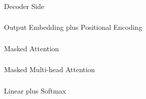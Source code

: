 \begin{frame}[fragile]\frametitle{}
\begin{center}
{\Large Decoder Side}
\end{center}
\end{frame}

\begin{frame}[fragile]\frametitle{}
\begin{center}
{\Large Output Embedding plus Positional Encoding}
\end{center}
\end{frame}

\begin{frame}[fragile]\frametitle{}
\begin{center}
{\Large Masked Attention}
\end{center}
\end{frame}

\begin{frame}[fragile]\frametitle{}
\begin{center}
{\Large Masked Multi-head Attention}
\end{center}
\end{frame}


\begin{frame}[fragile]\frametitle{}
\begin{center}
{\Large Linear plus Softmax}
\end{center}
\end{frame}


			
			
		


